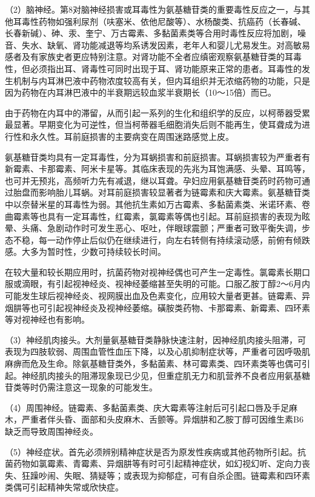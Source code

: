 （2）脑神经。第8对脑神经损害或耳毒性为氨基糖苷类的重要毒性反应之一，与其他耳毒性药物如强利尿剂（呋塞米、依他尼酸等）、水杨酸类、抗癌药（长春碱、长春新碱）、砷、汞、奎宁、万古霉素、多黏菌素类等合用时毒性反应将加剧，噪音、失水、缺氧、肾功能减退等均系诱发因素，老年人和婴儿尤易发生。对高敏易感者及有家族史者更应特别注意。对肾功能不全者应缜密观察氨基糖苷类的耳毒性，但必须指出耳、肾毒性可同时出现于耳、肾功能原来正常的患者。耳毒性的发生机制与内耳淋巴液中药物浓度较高有关，但内耳组织并无浓缩药物的功能，只是因为药物在内耳淋巴液中的半衰期远较血浆半衰期长（10～15倍）而已。

由于药物在内耳中的滞留，从而引起一系列的生化和组织学的反应，以柯蒂器受累最显著。早期变化为可逆性，但当柯蒂器毛细胞消失后则不能再生，使耳聋成为进行性和永久性。耳前庭损害的主要病变在周围迷路感觉上皮。

氨基糖苷类均具有一定耳毒性，分为耳蜗损害和前庭损害。耳蜗损害较为严重者有新霉素、卡那霉素、阿米卡星等。其临床表现的先兆为耳饱满感、头晕、耳鸣等，也可并无预兆，高频听力先有减退，继以耳聋。孕妇应用氨基糖苷类药时药物可通过胎盘而影响胎儿耳蜗。对耳前庭损害较显著者为链霉素和庆大霉素。氨基糖苷类中以奈替米星的耳毒性为弱。其他抗生素如万古霉素、多黏菌素类、米诺环素、卷曲霉素等也具有一定耳毒性，红霉素，氯霉素等偶也引起。耳前庭损害的表现为眩晕、头痛、急剧动作时可发生恶心、呕吐，伴眼球震颤；严重者可致平衡失调，步态不稳，每一动作停止后似仍在继续进行，向左右转侧有持续滚动感，前俯有倾跌感。大多为暂时性，少数可持续较长时间。

在较大量和较长期应用时，抗菌药物对视神经偶也可产生一定毒性。氯霉素长期口服或滴眼，有引起视神经炎、视神经萎缩甚至失明的可能。口服乙胺丁醇2～6月内可能发生球后视神经炎、视网膜出血及色素变化，应用较大量者更甚。链霉素、异烟肼等也可引起视神经炎及视神经萎缩。磺胺类药物、卡那霉素、新霉素、四环素等对视神经也有影响。

（3）神经肌肉接头。大剂量氨基糖苷类静脉快速注射，因神经肌肉接头阻滞，可表现为四肢软弱、周围血管性血压下降，以及心肌抑制症状等，严重者可因呼吸肌麻痹而危及生命。除氨基糖苷类外，多黏菌素、林可霉素类、四环素类等也偶可引起。神经肌肉接头的阻滞现象现已少见，但重症肌无力和肌营养不良者应用氨基糖苷类等时仍需注意这一现象的可能发生。

（4）周围神经。链霉素、多黏菌素类、庆大霉素等注射后可引起口唇及手足麻木，严重者伴头昏、面部和头皮麻木、舌颤等。异烟肼和乙胺丁醇可因维生素B{6}
缺乏而导致周围神经炎。

（5）神经症状。首先必须辨别精神症状是否为原发性疾病或其他药物所引起。抗菌药物如氯霉素、青霉素、异烟肼等有时可引起精神症状，如幻视幻听、定向力丧失、狂躁吵闹、失眠、猜疑等；或表现为抑郁症，可有自杀企图。链霉素和四环素类偶可引起精神失常或欣快症。
